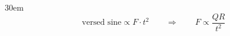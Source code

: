 \documentclass[border=4pt]{standalone}
\begin{document}
\begin{varwidth}{30em}
\large
\[ \text{versed sine} \propto F\cdot t^2 \qquad\Longrightarrow\qquad F \propto \dfrac{QR}{t^2} \]

\end{varwidth}
\end{document}
